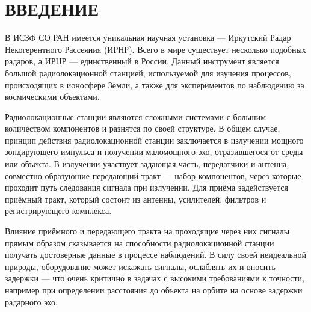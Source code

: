 \documentclass{report}
\begin{document}



\setcounter{page}{2} %
\tableofcontents  %

\setcounter{chapter}{0} %
\setcounter{section}{0} %
\setcounter{subsection}{0} %
\setcounter{equation}{0} %


\chapter*{ВВЕДЕНИЕ} %

В ИСЗФ СО РАН имеется уникальная научная установка --- Иркутский Радар Некогерентного Рассеяния (ИРНР). Всего в мире существует несколько подобных радаров, а ИРНР --- единственный в России. Данный инструмент является большой радиолокационной станцией, используемой для изучения процессов, происходящих в ионосфере Земли, а также для экспериментов по наблюдению за космическими объектами.

Радиолокационные станции являются сложными системами с большим количеством компонентов и разнятся по своей структуре. В общем случае, принцип действия радиолокационной станции заключается в излучении мощного зондирующего импульса и получении маломощного эхо, отразившегося от среды или объекта. В излучении участвует задающая часть, передатчики и антенна, совместно образующие передающий тракт --- набор компонентов, через которые проходит путь следования сигнала при излучении. Для приёма задействуется приёмный тракт, который состоит из антенны, усилителей, фильтров и регистрирующего комплекса.

Влияние приёмного и передающего тракта на проходящие через них сигналы прямым образом сказывается на способности радиолокационной станции получать достоверные данные в процессе наблюдений. В силу своей неидеальной природы, оборудование может искажать сигналы, ослаблять их и вносить задержки --- что очень критично в задачах с высокими требованиями к точности, например при определении расстояния до объекта на орбите на основе задержки радарного эхо.
\end{document}
